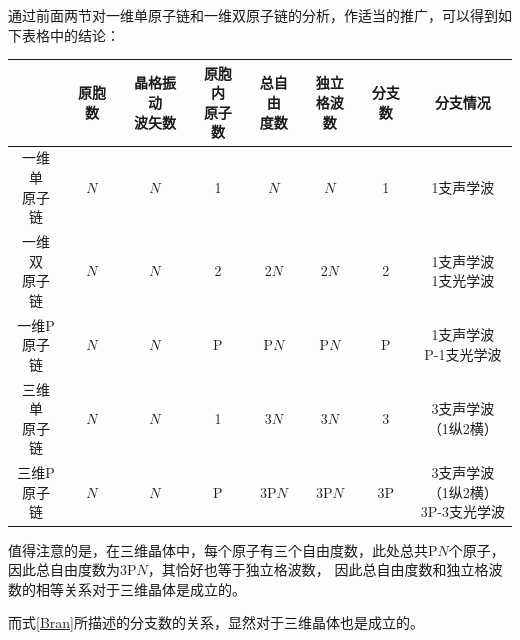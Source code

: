 \documentclass[declarePage]{ecnuthesis}
\begin{document}
通过前面两节对一维单原子链和一维双原子链的分析，作适当的推广，可以得到如下表格中的结论：
\begin{table}[htb]
    \centering
    \begin{tabular}{|c|c|c|c|c|c|c|c|}
        \hline
         & 原胞数 & \makecell[c]{晶格振动\\[-7pt]波矢数} & \makecell[c]{原胞内\\[-7pt]原子数} & \makecell[c]{总自由\\[-7pt]度数} & \makecell[c]{独立\\[-7pt]格波数} & 分支数 & 分支情况 \\ 
        \hline
        \makecell[c]{一维单\\[-7pt]原子链} & $N$   & $N$           & 1           & $N$       & $N$       & 1      & 1支声学波 \\ 
        \hline
        \makecell[c]{一维双\\[-7pt]原子链} & $N$   & $N$           & 2           & 2$N$      & 2$N$      & 2      & \makecell[c]{1支声学波\\[-7pt]1支光学波} \\ 
        \hline
        \makecell[c]{一维P\\[-7pt]原子链}  & $N$   & $N$           & P           & P$N$      & P$N$      & P      & \makecell[c]{1支声学波\\[-7pt]P-1支光学波} \\ 
        \hline
        \makecell[c]{三维单\\[-7pt]原子链} & $N$   & $N$           & 1           & 3$N$      & 3$N$      & 3      & \makecell[c]{3支声学波\\[-7pt]（1纵2横）} \\  
        \hline
        \makecell[c]{三维P\\[-7pt]原子链}  & $N$   & $N$           & P           & 3P$N$     & 3P$N$     & 3P     & \makecell[c]{3支声学波\\[-7pt]（1纵2横）\\[-7pt]3P-3支光学波} \\ 
        \hline
    \end{tabular}
\end{table}

值得注意的是，在三维晶体中，每个原子有三个自由度数，此处总共P$N$个原子，因此总自由度数为3P$N$，其恰好也等于独立格波数，%
因此总自由度数和独立格波数的相等关系对于三维晶体是成立的。

而式\ref{Bran}所描述的分支数的关系，显然对于三维晶体也是成立的。
\end{document}
